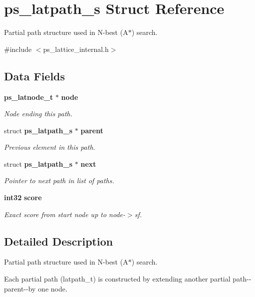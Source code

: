 \section{ps\-\_\-latpath\-\_\-s \-Struct \-Reference}
\label{structps__latpath__s}


\-Partial path structure used in \-N-\/best (\-A$\ast$) search.  




{\ttfamily \#include $<$ps\-\_\-lattice\-\_\-internal.\-h$>$}

\subsection*{\-Data \-Fields}
\begin{DoxyCompactItemize}
\item 
{\bf ps\-\_\-latnode\-\_\-t} $\ast$ {\bf node}
\begin{DoxyCompactList}\small\item\em \-Node ending this path. \end{DoxyCompactList}\item 
struct {\bf ps\-\_\-latpath\-\_\-s} $\ast$ {\bf parent}
\begin{DoxyCompactList}\small\item\em \-Previous element in this path. \end{DoxyCompactList}\item 
struct {\bf ps\-\_\-latpath\-\_\-s} $\ast$ {\bf next}
\begin{DoxyCompactList}\small\item\em \-Pointer to next path in list of paths. \end{DoxyCompactList}\item 
{\bf int32} {\bf score}
\begin{DoxyCompactList}\small\item\em \-Exact score from start node up to node-\/$>$sf. \end{DoxyCompactList}\end{DoxyCompactItemize}


\subsection{\-Detailed \-Description}
\-Partial path structure used in \-N-\/best (\-A$\ast$) search. 

\-Each partial path (latpath\-\_\-t) is constructed by extending another partial path-\/-\/parent-\/-\/by one node. 


